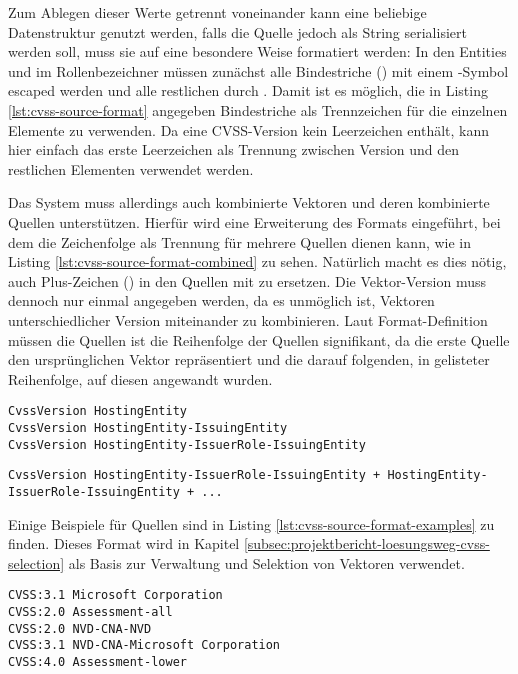 Zum Ablegen dieser Werte getrennt voneinander kann eine beliebige Datenstruktur genutzt werden, falls die Quelle jedoch als String serialisiert werden soll, muss sie auf eine besondere Weise formatiert werden:
In den Entities und im Rollenbezeichner müssen zunächst alle Bindestriche (\qt{-}) mit einem \qt{\textbackslash}-Symbol escaped werden und alle restlichen \qt{\textbackslash} durch \qt{\textbackslash\textbackslash}.
Damit ist es möglich, die in Listing \ref{lst:cvss-source-format} angegeben Bindestriche als Trennzeichen für die einzelnen Elemente zu verwenden.
Da eine CVSS-Version kein Leerzeichen enthält, kann hier einfach das erste Leerzeichen als Trennung zwischen Version und den restlichen Elementen verwendet werden.

Das System muss allerdings auch kombinierte Vektoren und deren kombinierte Quellen unterstützen.
Hierfür wird eine Erweiterung des Formats eingeführt, bei dem die Zeichenfolge \qt{ + } als Trennung für mehrere Quellen dienen kann, wie in Listing \ref{lst:cvss-source-format-combined} zu sehen.
Natürlich macht es dies nötig, auch Plus-Zeichen (\qt{+}) in den Quellen mit \qt{\textbackslash+} zu ersetzen.
Die Vektor-Version muss dennoch nur einmal angegeben werden, da es unmöglich ist, Vektoren unterschiedlicher Version miteinander zu kombinieren.
Laut Format-Definition müssen die Quellen ist die Reihenfolge der Quellen signifikant, da die erste Quelle den ursprünglichen Vektor repräsentiert und die darauf folgenden, in gelisteter Reihenfolge, auf diesen angewandt wurden.

\begin{lstlisting}[language={}, label={lst:cvss-source-format}, caption={CVSS-Quellen Format}]
CvssVersion HostingEntity
CvssVersion HostingEntity-IssuingEntity
CvssVersion HostingEntity-IssuerRole-IssuingEntity
\end{lstlisting}

\begin{lstlisting}[language={}, label={lst:cvss-source-format-combined}, caption={CVSS-Quellen Format \(Kombiniert\)}]
CvssVersion HostingEntity-IssuerRole-IssuingEntity + HostingEntity-IssuerRole-IssuingEntity + ...
\end{lstlisting}

Einige Beispiele für Quellen sind in Listing \ref{lst:cvss-source-format-examples} zu finden.
Dieses Format wird in Kapitel \ref{subsec:projektbericht-loesungsweg-cvss-selection} als Basis zur Verwaltung und Selektion von Vektoren verwendet.

\begin{lstlisting}[language={}, label={lst:cvss-source-format-examples}, caption={CVSS Sources Format}]
CVSS:3.1 Microsoft Corporation
CVSS:2.0 Assessment-all
CVSS:2.0 NVD-CNA-NVD
CVSS:3.1 NVD-CNA-Microsoft Corporation
CVSS:4.0 Assessment-lower
\end{lstlisting}

